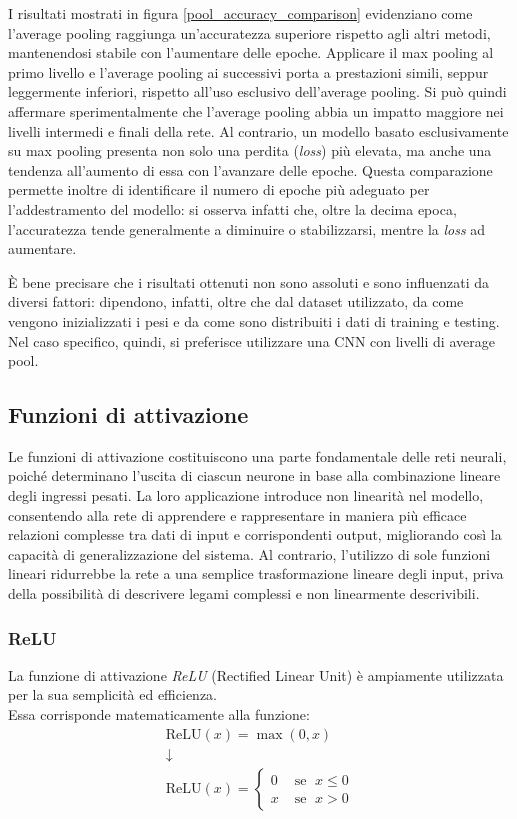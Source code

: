 \documentclass[a4paper,12pt]{article}
\begin{document}
I risultati mostrati in figura \ref{pool_accuracy_comparison} evidenziano come l'average pooling raggiunga un'accuratezza superiore rispetto agli altri metodi, mantenendosi stabile con l'aumentare delle epoche.
Applicare il max pooling al primo livello e l'average pooling ai successivi porta a prestazioni simili, seppur leggermente inferiori, rispetto all'uso esclusivo dell'average pooling. Si può quindi affermare sperimentalmente che l'average pooling abbia un impatto maggiore nei livelli intermedi e finali della rete.
Al contrario, un modello basato esclusivamente su max pooling presenta non solo una perdita (\textit{loss}) più elevata, ma anche una tendenza all'aumento di essa con l'avanzare delle epoche. Questa comparazione permette inoltre di identificare il numero di epoche più adeguato per l'addestramento del modello: si osserva infatti che, oltre la decima epoca, l'accuratezza tende generalmente a diminuire o stabilizzarsi, mentre la \textit{loss} ad aumentare.

È bene precisare che i risultati ottenuti non sono assoluti e sono influenzati da diversi fattori: dipendono, infatti, oltre che dal dataset utilizzato, da come vengono inizializzati i pesi e da come sono distribuiti i dati di training e testing. Nel caso specifico, quindi, si preferisce utilizzare una CNN con livelli di average pool.

\subsection{Funzioni di attivazione}
Le funzioni di attivazione costituiscono una parte fondamentale delle reti neurali, poiché determinano l'uscita di ciascun neurone in base alla combinazione lineare degli ingressi pesati. La loro applicazione introduce non linearità nel modello, consentendo alla rete di apprendere e rappresentare in maniera più efficace relazioni complesse tra dati di input e corrispondenti output, migliorando così la capacità di generalizzazione del sistema.  
Al contrario, l'utilizzo di sole funzioni lineari ridurrebbe la rete a una semplice trasformazione lineare degli input, priva della possibilità di descrivere legami complessi e non linearmente descrivibili.

\subsubsection{ReLU}
La funzione di attivazione \textit{ReLU} (Rectified Linear Unit) è ampiamente utilizzata per la sua semplicità ed efficienza.\\
Essa corrisponde matematicamente alla funzione:
\begin{gather*}
    \text{ReLU}(x) = \max (0, x) \\
    \downarrow \\
    \text{ReLU}(x) =
        \begin{cases}
            0 & \text{ se } \; x\leq 0 \\
            x & \text{ se } \; x > 0 
        \end{cases}
\end{gather*}
\end{document}
